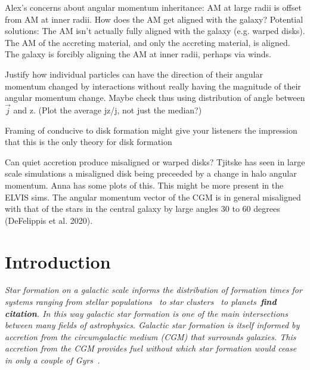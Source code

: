 \documentclass[fleqn,usenatbib]{mnras}
\begin{document}
Alex's concerns about angular momentum inheritance:
AM at large radii is offset from AM at inner radii.
How does the AM get aligned with the galaxy?
Potential solutions:
The AM isn't actually fully aligned with the galaxy (e.g. warped disks).
The AM of the accreting material, and only the accreting material, is aligned.
The galaxy is forcibly aligning the AM at inner radii, perhaps via winds.

Justify how individual particles can have the direction of their angular momentum changed by interactions without really having the magnitude of their angular momentum change.
Maybe check thus using distribution of angle between $\vec{j}$ and z. (Plot the average jz/j, not just the median?)

Framing of conducive to disk formation might give your listeners the impression that this is the only theory for disk formation

Can quiet accretion produce misaligned or warped disks?
Tjitske has seen in large scale simulations a misaligned disk being preceeded by a change in halo angular momentum.
Anna has some plots of this. This might be more present in the ELVIS sims.
The angular momentum vector of the CGM is in general misaligned with that of the stars in the central galaxy by large angles  30 to 60 degrees (DeFelippis et al. 2020).

\section{Introduction}
\label{s: introduction}

\textit{
Star formation on a galactic scale informs the distribution of formation times for systems ranging from stellar populations~\cite{Yu2021} to star clusters~\citep[e.g.][]{Grudic2020} to planets~\textbf{find citation}.
In this way galactic star formation is one of the main intersections between many fields of astrophysics.
Galactic star formation is itself informed by accretion from the circumgalactic medium (CGM) that surrounds galaxies.
This accretion from the CGM provides fuel without which star formation would cease in only a couple of Gyrs~\cite[e.g.][]{Prochaska2009, Bauermeister2010, Spring2017}.
}
\end{document}
